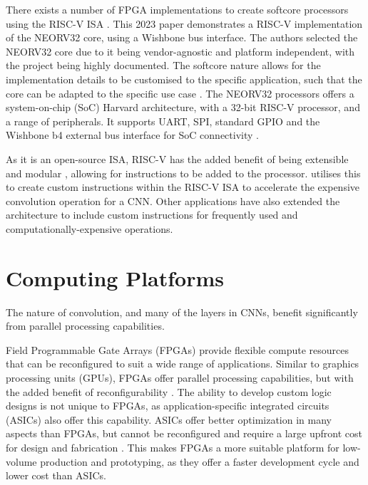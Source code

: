 There exists a number of FPGA implementations to create softcore processors using the RISC-V ISA \cite{RISCFPGA}. 
This 2023 paper \cite{Neutron} demonstrates a RISC-V implementation of the NEORV32 core, using a Wishbone bus interface. 
The authors selected the NEORV32 core due to it being vendor-agnostic and platform independent, with the project being highly documented.
The softcore nature allows for the implementation details to be customised to the specific application, such that the core can be adapted to the specific use case \cite{DCT}. 
The NEORV32 processors offers a system-on-chip (SoC) Harvard architecture, with a 32-bit RISC-V processor, and a range of peripherals.
It supports UART, SPI, standard GPIO and the Wishbone b4 external bus interface for SoC connectivity \cite{NEORV32}.

As it is an open-source ISA, RISC-V has the added benefit of being extensible and modular \cite{Cryptography}, allowing for instructions to be added to the processor.
\cite{Reconfigurable} utilises this to create custom instructions within the RISC-V ISA to accelerate the expensive convolution operation for a CNN.
Other applications have also extended the architecture to include custom instructions for frequently used and computationally-expensive operations.

\section{Computing Platforms}
\label{sec:platforms}
The nature of convolution, and many of the layers in CNNs, benefit significantly from parallel processing capabilities.

Field Programmable Gate Arrays (FPGAs) provide flexible compute resources that can be reconfigured to suit a wide range of applications. Similar to graphics processing units (GPUs), FPGAs offer parallel processing capabilities, but with the added benefit of reconfigurability \cite{Parallelism}. The ability to develop custom logic designs is not unique to FPGAs, as application-specific integrated circuits (ASICs) also offer this capability. ASICs offer better optimization in many aspects than FPGAs, but cannot be reconfigured and require a large upfront cost for design and fabrication \cite{AsicOptimization}. This makes FPGAs a more suitable platform for low-volume production and prototyping, as they offer a faster development cycle and lower cost than ASICs.

